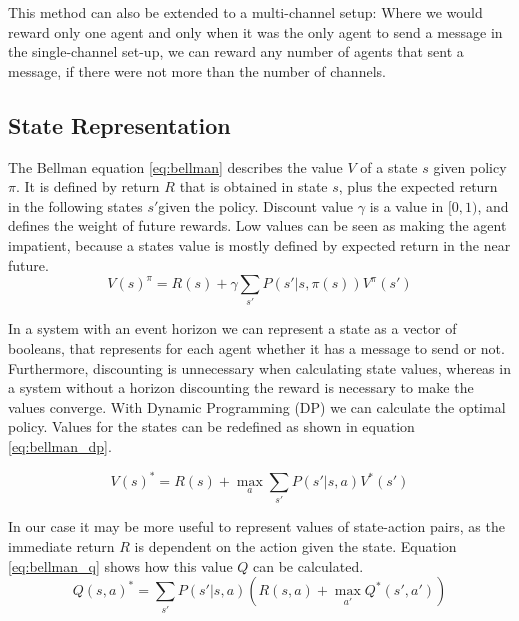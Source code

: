 \documentclass{article}
\begin{document}
\begin{multicols}{2}
		This method can also be extended to a multi-channel setup: Where we would
		reward only one agent and only when it was the only agent to send
		a message in the single-channel set-up, we can reward any number of
		agents that sent a message, if there were not more than the number of
		channels.

		\subsection{State Representation}
		\label{sub:state_representation}
		The Bellman equation \ref{eq:bellman} describes the value $V$ of a state
		$s$ given policy $\pi$. It is defined by return $R$ that is obtained in
		state $s$, plus the expected return in the following states $s'$given the
		policy. Discount value $\gamma$ is a value in $[0, 1)$, and defines the
		weight of future rewards. Low values can be seen as making the agent
		impatient, because a states value is mostly defined by expected return in
		the near future.
		\begin{equation}
		\displaystyle
		V(s)^\pi = R(s) + \gamma\sum_{s'} P(s'|s, \pi(s)) V^\pi(s')
		\label{eq:bellman}
		\end{equation}

		In a system with an event horizon we can represent a state as a vector of
		booleans, that represents for each agent whether it has a message to send
		or not. Furthermore, discounting is unnecessary when calculating state
		values, whereas in a system without a horizon discounting the reward is
		necessary to make the values converge. With Dynamic Programming (DP) we
		can calculate the optimal policy. Values for the states can be redefined
		as shown in equation \ref{eq:bellman_dp}.

		\begin{equation}
		\displaystyle
		V(s)^* = R(s) + \max_a \sum_{s'} P(s'|s, a) V^*(s')
		\label{eq:bellman_dp}
		\end{equation}

		In our case it may be more useful to represent values of state-action
		pairs, as the immediate return $R$ is dependent on the action given the
		state. Equation \ref{eq:bellman_q} shows how this value $Q$ can be
		calculated.
		\begin{equation}
		\displaystyle
		Q(s, a)^* = \sum_{s'} P(s'|s, a) \left(R(s, a) + \max_{a'} Q^*(s', a')\right)
		\label{eq:bellman_q}
		\end{equation}


\end{multicols}
\end{document}
